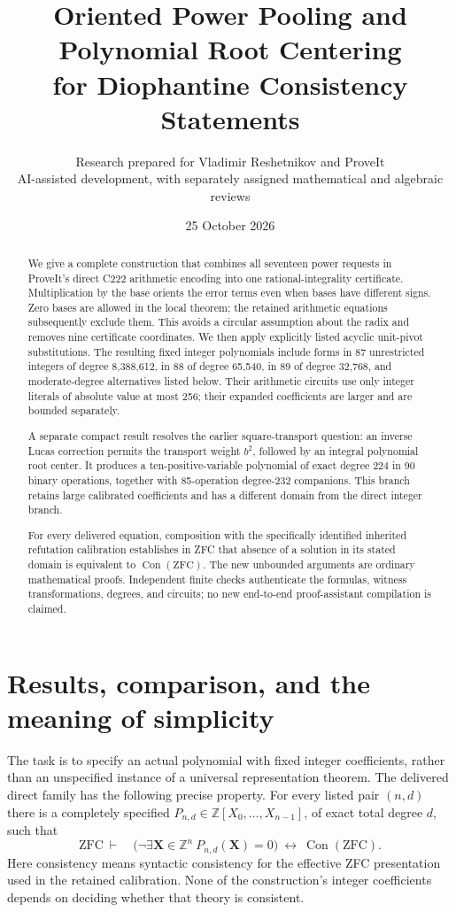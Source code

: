 \documentclass[11pt]{article}
\title{Oriented Power Pooling and Polynomial Root Centering\\for Diophantine Consistency Statements}
\author{Research prepared for Vladimir Reshetnikov and ProveIt\\
\small AI-assisted development, with separately assigned mathematical and algebraic reviews}
\date{25 October 2026}
\theoremstyle{definition}\newtheorem{definition}[theorem]{Definition}
\theoremstyle{remark}\newtheorem{remark}[theorem]{Remark}
\newcommand{\Z}{\mathbb Z}
\newcommand{\Con}{\operatorname{Con}}
\begin{document}
\maketitle
\begin{abstract}
We give a complete construction that combines all seventeen power requests
in ProveIt's direct C222 arithmetic encoding into one rational-integrality
certificate. Multiplication by the base orients the error terms even when
bases have different signs. Zero bases are allowed in the local theorem;
the retained arithmetic equations subsequently exclude them. This avoids
a circular assumption about the radix and removes nine certificate
coordinates. We then apply explicitly listed acyclic unit-pivot
substitutions. The resulting fixed integer polynomials include forms in
87 unrestricted integers of degree 8,388,612, in 88 of degree 65,540,
in 89 of degree 32,768, and
moderate-degree alternatives listed below. Their arithmetic circuits use
only integer literals of absolute value at most 256; their expanded
coefficients are larger and are bounded separately.

A separate compact result resolves the earlier square-transport question:
an inverse Lucas correction permits the transport weight $b^2$, followed
by an integral polynomial root center. It produces a ten-positive-variable
polynomial of exact degree 224 in 90 binary operations, together with
85-operation degree-232 companions. This branch retains large calibrated
coefficients and has a different domain from the direct integer branch.

For every delivered equation, composition with the specifically identified
inherited refutation calibration establishes in ZFC that absence of a
solution in its stated domain is equivalent to $\Con(\mathrm{ZFC})$.
The new unbounded arguments are ordinary mathematical proofs. Independent
finite checks authenticate the formulas, witness transformations, degrees,
and circuits; no new end-to-end proof-assistant compilation is claimed.
\end{abstract}

\tableofcontents

\section{Results, comparison, and the meaning of simplicity}

The task is to specify an actual polynomial with fixed integer
coefficients, rather than an unspecified instance of a universal
representation theorem. The delivered direct family has the following
precise property. For every listed pair $(n,d)$ there is a completely
specified $P_{n,d}\in\Z[X_0,\ldots,X_{n-1}]$, of exact total degree $d$,
such that
\begin{equation}
\mathrm{ZFC}\ \vdash\quad
\bigl(\neg\exists\mathbf X\in\Z^n\ P_{n,d}(\mathbf X)=0\bigr)
\ \longleftrightarrow\ \Con(\mathrm{ZFC}).
\label{eq:target}
\end{equation}
Here consistency means syntactic consistency for the effective ZFC
presentation used in the retained calibration. None of the construction's
integer coefficients depends on deciding whether that theory is consistent.
\end{document}
